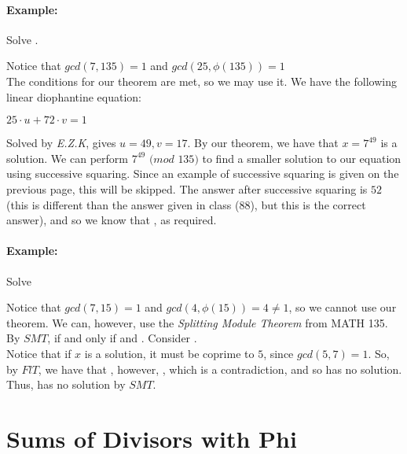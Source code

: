 \documentclass[../main.tex]{subfiles}
\begin{document}
\paragraph{Example:} Solve .
\begin{ans}
    Notice that $gcd(7,135)=1$ and $gcd(25, \phi(135))=1$ \\
    The conditions for our theorem are met, so we may use it. \sspace
    We have the following linear diophantine equation: \\
    \centerline{$25 \cdot u + 72 \cdot v = 1$}
    Solved by \textit{E.Z.K}, gives $u=49, v=17$. \sspace
    By our theorem, we have that $x=7^{49}$ is a solution. We can perform $7^{49}$ $(mod$ $135)$ to find a smaller solution to our equation using successive squaring. Since an example of successive squaring is given on the previous page, this will be skipped. The answer after successive squaring is $52$ (this is different than the answer given in class (88), but this is the correct answer), and so we know that , as required.
\end{ans}

\paragraph{Example:} Solve 
\begin{ans}
    Notice that $gcd(7,15)=1$ and $gcd(4, \phi(15))=4 \neq 1$, so we cannot use our theorem. \sspace
    We can, however, use the \textit{Splitting Module Theorem} from MATH 135. \\
    By $SMT$,  if and only if  and . \sspace
    Consider . \\
    Notice that if $x$ is a solution, it must be coprime to $5$, since $gcd(5,7)=1$. So, by $FlT$, we have that , however, , which is a contradiction, and so  has no solution. \\
    Thus,  has no solution by $SMT$.
\end{ans}

\section{Sums of Divisors with Phi}
\end{document}
